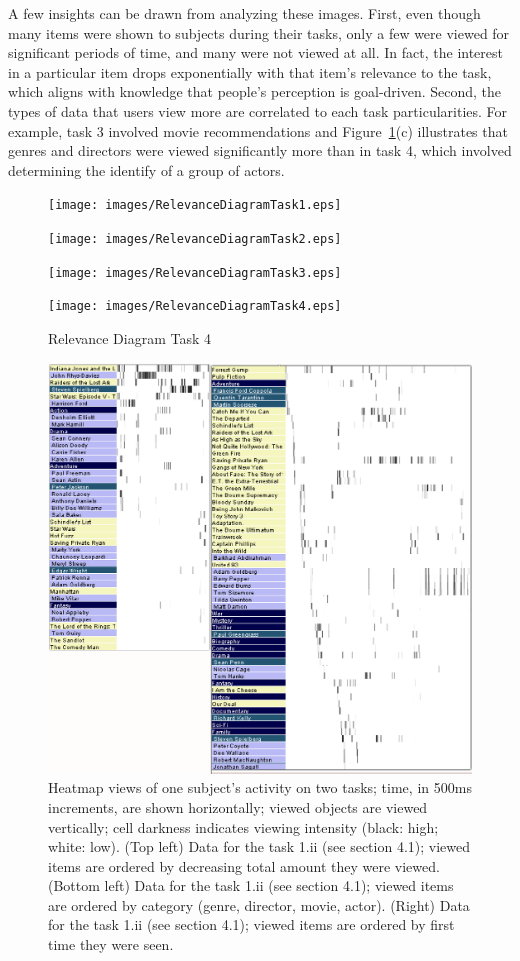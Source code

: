 A few insights can be drawn from analyzing these images. First, even though many items were shown to subjects during their tasks, only a few were viewed for significant periods of time, and many were not viewed at all. In fact, the interest in a particular item drops exponentially with that item's relevance to the task, which aligns with knowledge that people's perception is goal-driven.  Second, the types of data that users view more are correlated to each task particularities. For example, task 3 involved movie recommendations and Figure~\ref{fig:RelevanceDiagram}(c) illustrates that genres and directors were viewed significantly more than in task 4, which involved determining the identify of a group of actors. 



\begin{figure}[!hbt]
  \centering
  \texttt{[image: images/RelevanceDiagramTask1.eps]}
	\caption*{Relevance Diagram Task 1}
	\texttt{[image: images/RelevanceDiagramTask2.eps]}
	\caption*{Relevance Diagram Task 2}
	\texttt{[image: images/RelevanceDiagramTask3.eps]}
	\caption*{Relevance Diagram Task 3}
	\texttt{[image: images/RelevanceDiagramTask4.eps]}
	\caption*{Relevance Diagram Task 4}
	\label{fig:RelevanceDiagram}
\end{figure}


\begin{figure}[!ht]
  \centering
  \includegraphics[width=0.75\linewidth]{images/heatmaps.eps}
  \caption{Heatmap views of one subject's activity on two tasks; time, in 500ms increments, are shown horizontally; viewed objects are viewed vertically; cell darkness indicates viewing intensity (black: high; white: low). (Top left) Data for the task 1.ii (see section 4.1); viewed items are ordered by decreasing total amount they were viewed. (Bottom left) Data for the task 1.ii (see section 4.1); viewed items are ordered by category (genre, director, movie, actor). (Right) Data for the task 1.ii (see section 4.1); viewed items are ordered by first time they were seen. 
}
	\label{fig:heatmap}
\end{figure}



